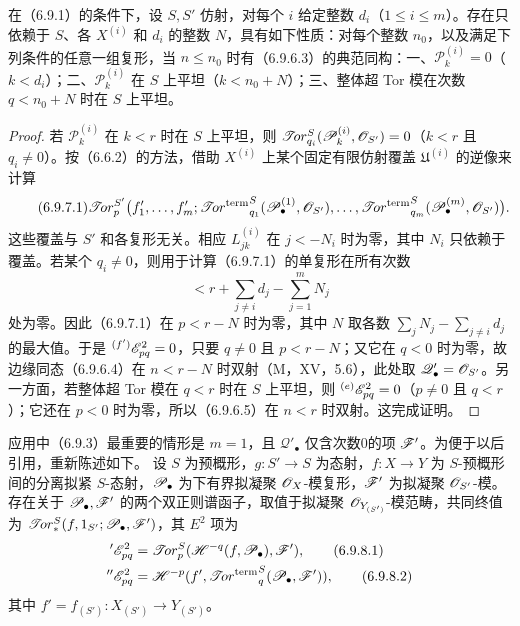 在（6.9.1）的条件下，设 $S,S'$ 仿射，对每个 $i$ 给定整数 $d_i$（$1\leq i\leq m$）。存在只依赖于 $S$、各 $X^{(i)}$ 和 $d_i$ 的整数 $N$，具有如下性质：对每个整数 $n_0$，以及满足下列条件的任意一组复形，当 $n\leq n_0$ 时有（6.9.6.3）的典范同构：一、$\mathscr P^{(i)}_k=0$（$k<d_i$）；二、$\mathscr P^{(i)}_k$ 在 $S$ 上平坦（$k<n_0+N$）；三、整体超 Tor 模在次数 $q<n_0+N$ 时在 $S$ 上平坦。
\begin{proof}
若 $\mathscr P^{(i)}_k$ 在 $k<r$ 时在 $S$ 上平坦，则
$\mathscr{T}\!or^S_{q_i}(\mathscr P^{(i)}_k,\mathscr O_{S'})=0$（$k<r$ 且 $q_i\ne0$）。按（6.6.2）的方法，借助 $X^{(i)}$ 上某个固定有限仿射覆盖 $\mathfrak U^{(i)}$ 的逆像来计算
\begin{equation}\tag{6.9.7.1}
 \mathscr{T}\!or_p^{S'}\bigl(f'_1,\ldots,f'_m;
    \mathop{\mathscr{T}\!or^{\mathrm{term}}}\nolimits^S_{q_1}(\mathscr P^{(1)}_\bullet,\mathscr O_{S'}),\ldots,
    \mathop{\mathscr{T}\!or^{\mathrm{term}}}\nolimits^S_{q_m}(\mathscr P^{(m)}_\bullet,\mathscr O_{S'})\bigr).
\end{equation}
这些覆盖与 $S'$ 和各复形无关。相应 $L^{(i)}_{jk}$ 在 $j<-N_i$ 时为零，其中 $N_i$ 只依赖于覆盖。若某个 $q_i\ne0$，则用于计算（6.9.7.1）的单复形在所有次数
\[
 <r+\sum_{j\ne i}d_j-\sum_{j=1}^mN_j
\]
处为零。因此（6.9.7.1）在 $p<r-N$ 时为零，其中 $N$ 取各数
$\sum_jN_j-\sum_{j\ne i}d_j$ 的最大值。于是 ${}^{(f')}\mathscr E^2_{pq}=0$，只要 $q\ne0$ 且 $p<r-N$；又它在 $q<0$ 时为零，故边缘同态（6.9.6.4）在 $n<r-N$ 时双射（M，XV，5.6），此处取 $\mathscr Q'_\bullet=\mathscr O_{S'}$。另一方面，若整体超 Tor 模在 $q<r$ 时在 $S$ 上平坦，则 ${}^{(e)}\mathscr E^2_{pq}=0$（$p\ne0$ 且 $q<r$）；它还在 $p<0$ 时为零，所以（6.9.6.5）在 $n<r$ 时双射。这完成证明。
\end{proof}

应用中（6.9.3）最重要的情形是 $m=1$，且 $\mathscr Q'_\bullet$ 仅含次数0的项 $\mathscr F'$。为便于以后引用，重新陈述如下。
设 $S$ 为预概形，$g:S'\to S$ 为态射，$f:X\to Y$ 为 $S$-预概形间的分离拟紧 $S$-态射，$\mathscr P_\bullet$ 为下有界拟凝聚 $\mathscr O_X$-模复形，$\mathscr F'$ 为拟凝聚 $\mathscr O_{S'}$-模。存在关于 $\mathscr P_\bullet,\mathscr F'$ 的两个双正则谱函子，取值于拟凝聚 $\mathscr O_{Y_{(S')}}$-模范畴，共同终值为 $\mathscr{T}\!or_*^S(f,1_{S'};\mathscr P_\bullet,\mathscr F')$，其 $E^2$ 项为
\begin{align}
 {}'\mathscr E^2_{pq}&=\mathscr{T}\!or_p^S(\mathscr H^{-q}(f,\mathscr P_\bullet),\mathscr F'),\tag{6.9.8.1}\\
 {}''\mathscr E^2_{pq}&=\mathscr H^{-p}(f',\mathop{\mathscr{T}\!or^{\mathrm{term}}}\nolimits_q^S(\mathscr P_\bullet,\mathscr F')),\tag{6.9.8.2}
\end{align}
其中 $f'=f_{(S')}:X_{(S')}\to Y_{(S')}$。

